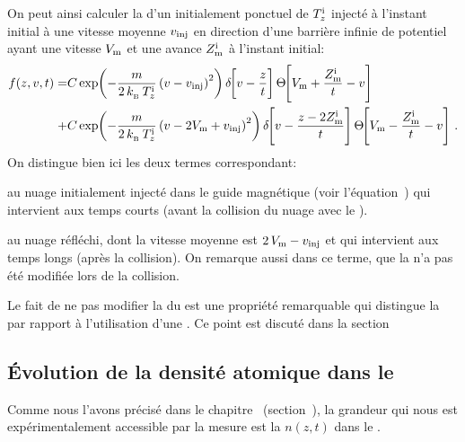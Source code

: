 {
On peut ainsi calculer
la \fdd d'un \pat initialement ponctuel de \templong $T_{z}^{\rm i}$ injecté à l'instant initial à une vitesse moyenne $v_{{\rm {inj}}}$ en direction d'une barrière infinie de potentiel ayant une vitesse $V_{\rm {m}}$ et une avance $Z_{\mathrm {m}}^{\mathrm i}$ à l'instant initial:
\begin{align}
	f(z,v,t)	=&%
	C \Expo{-\frac{m}{2\,\kb\,\Tlongini} \left( v - \vinj \right)^2}
	\Dirac{v - \frac{z}{t}}
	\Heaviside{\Vmir + \frac{\Zmirini}{t} - v}	\nonumber \\
	+&%
	C \Expo{-\frac{m}{2\,\kb\,\Tlongini} \left( v - 2 \Vmir + \vinj \right)^2}
	\Dirac{v - \frac{z-2\Zmirini}{t}}
	\Heaviside{\Vmir - \frac{\Zmirini}{t} - v}
	\pointformule
	\label{eq:ftPaquetResultat}
\end{align}
On distingue bien ici les deux termes correspondant:
\begin{itemizel}
	\item au nuage initialement injecté dans le guide magnétique (voir l'équation~) qui intervient aux temps courts (avant la collision du nuage avec le \mimo).
	\item au nuage réfléchi, dont la vitesse moyenne est $2\,V_{\rm {m}}-v_{{\rm {inj}}}$ et qui intervient aux temps longs (après la collision). On remarque aussi dans ce terme, que la \templong n'a pas été modifiée lors de la collision. 
\end{itemizel}
}
Le fait de ne pas modifier la \dispvitlong du \pat est une propriété remarquable qui distingue la \techmimo par rapport à l'utilisation d'une \secpent. Ce point est discuté dans la section~

%


\subsection{Évolution de la densité atomique dans le \gm}

Comme nous l'avons précisé dans le chapitre~ (section~), la grandeur qui nous est expérimentalement accessible par la mesure est la \datlin $n(z,t)$ dans le \gm. 

